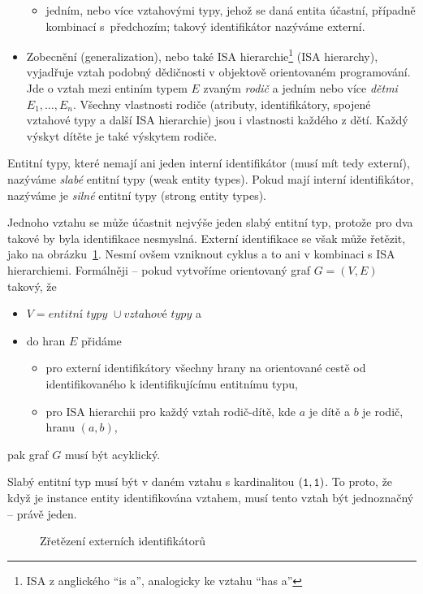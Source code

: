 \begin{itemize}
\begin{itemize}
          \item jedním, nebo více vztahovými typy, jehož se daná entita účastní, případně kombinací s~předchozím; takový identifikátor nazýváme externí.
        \end{itemize}
  \item Zobecnění (generalization), nebo také ISA hierarchie\footnote{ISA z anglického \enquote{is a}, analogicky ke vztahu \enquote{has a}} (ISA hierarchy), vyjadřuje vztah podobný dědičnosti v objektově orientovaném programování.
        Jde o vztah mezi entiním typem $E$ zvaným \emph{rodič} a jedním nebo více \emph{dětmi} $E_1, \dots, E_n$.
        Všechny vlastnosti rodiče (atributy, identifikátory, spojené vztahové typy a další ISA hierarchie) jsou i vlastnosti každého z dětí.
        Každý výskyt dítěte je také výskytem rodiče.
\end{itemize}

Entitní typy, které nemají ani jeden interní identifikátor (musí mít tedy externí), nazýváme \emph{slabé} entitní typy (weak entity types).
Pokud mají interní identifikátor, nazýváme je \emph{silné} entitní typy (strong entity types).

Jednoho vztahu se může účastnit nejvýše jeden slabý entitní typ, protože pro dva takové by byla identifikace nesmyslná.
Externí identifikace se však může řetězit, jako na obrázku~\ref{fig:er-external-identifier-chain}.
Nesmí ovšem vzniknout cyklus a to ani v kombinaci s ISA hierarchiemi.
Formálněji -- pokud vytvoříme orientovaný graf $G=(V,E)$ takový, že
\begin{itemize}
  \item $V = \textit{entitní typy }\cup\textit{vztahové typy}$ a
  \item do hran $E$ přidáme
        \begin{itemize}
          \item pro externí identifikátory všechny hrany na orientované cestě od identifikovaného k identifikujícímu entitnímu typu,
          \item pro ISA hierarchii pro každý vztah rodič-dítě, kde $a$ je dítě a $b$ je rodič, hranu $(a, b)$,
        \end{itemize}
\end{itemize}
pak graf $G$ musí být acyklický.

Slabý entitní typ musí být v daném vztahu s kardinalitou $(\texttt{1},\texttt{1})$.
To proto, že když je instance entity identifikována vztahem, musí tento vztah být jednoznačný -- právě jeden.

\begin{figure}[!htb]
  \centering
  \caption{Zřetězení externích identifikátorů}
  \label{fig:er-external-identifier-chain}
\end{figure}

